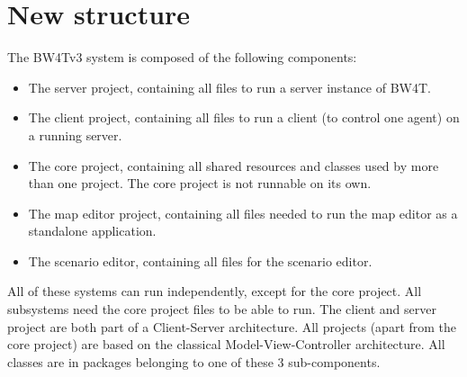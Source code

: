 \section{New structure}
The BW4Tv3 system is composed of the following components:
\begin{itemize}
\item
The server project, containing all files to run a server instance of BW4T.
\item
The client project, containing all files to run a client (to control one agent) on a running server. 
\item
The core project, containing all shared resources and classes used by more than one project. The core project is not runnable on its own. 
\item
The map editor project, containing all files needed to run the map editor as a standalone application.
\item
The scenario editor, containing all files for the scenario editor.
\end{itemize}

All of these systems can run independently, except for the core project. All subsystems need the core project files to be able to run. The client and server project are both part of a Client-Server architecture. All projects (apart from the core project) are based on the classical Model-View-Controller architecture. All classes are in packages belonging to one of these 3 sub-components. 